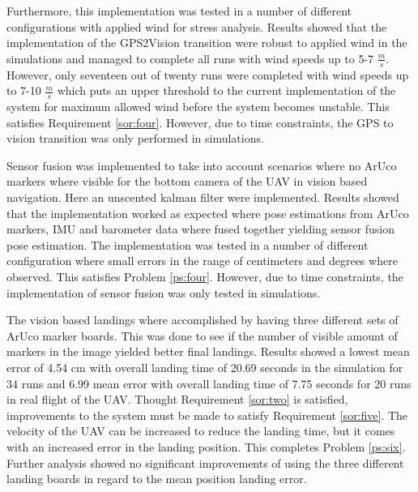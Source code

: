 \documentclass[../Head/report.tex]{subfiles}
\begin{document}
Furthermore, this implementation was tested in a number of different configurations with applied wind for stress analysis. Results showed that the implementation of the GPS2Vision transition were robust to applied wind in the simulations and managed to complete all runs with wind speeds up to 5-7 $\frac{m}{s}$. However, only seventeen out of twenty runs were completed with wind speeds up to 7-10 $\frac{m}{s}$ which puts an upper threshold to the current implementation of the system for maximum allowed wind before the system becomes unstable. This satisfies Requirement \ref{sor:four}. However, due to time constraints, the GPS to vision transition was only performed in simulations. 

Sensor fusion was implemented to take into account scenarios where no ArUco markers where visible for the bottom camera of the UAV in vision based navigation. Here an unscented kalman filter were implemented. Results showed that the implementation worked as expected where pose estimations from ArUco markers, IMU and barometer data where fused together yielding sensor fusion pose estimation. The implementation was tested in a number of different configuration where small errors in the range of centimeters and degrees where observed. This satisfies Problem \ref{ps:four}. However, due to time constraints, the implementation of sensor fusion was only tested in simulations.

The vision based landings where accomplished by having three different sets of ArUco marker boards. This was done to see if the number of visible amount of markers in the image yielded better final landings. Results showed a lowest mean error of 4.54 cm with overall landing time of 20.69 seconds in the simulation for 34 runs and 6.99 mean error with overall landing time of 7.75 seconds for 20 runs in real flight of the UAV. Thought Requirement \ref{sor:two} is satisfied, improvements to the system must be made to satisfy Requirement \ref{sor:five}. The velocity of the UAV can be increased to reduce the landing time, but it comes with an increased error in the landing position. This completes Problem \ref{ps:six}. Further analysis showed no significant improvements of using the three different landing boards in regard to the mean position landing error.
\end{document}
